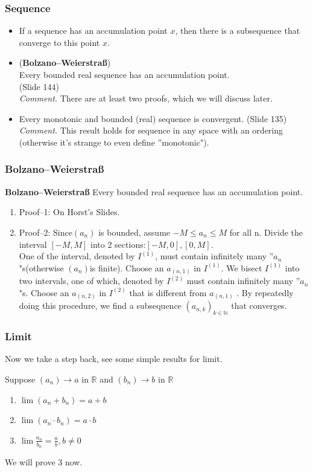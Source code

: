 \documentclass[12pt, t]{beamer}
\renewcommand{\emph}[1]{{\color{Turquoise3}\textsl{#1}}}
\begin{document}
\begin{frame}
    \frametitle{Sequence}
    \begin{itemize}
        \item If a sequence has an accumulation point $x$, then there is a subsequence that converge to this point $x$.
        \item (\textbf{Bolzano--Weierstraß})\\ Every bounded real sequence has an accumulation point. \\(Slide 144)\\
              \emph{Comment.} There are at least two proofs, which we will discuss later.
        \item Every monotonic and bounded (real) sequence is convergent. (Slide 135)\\
              \emph{Comment.} This result holds for sequence in any space with an ordering (otherwise it's
              strange to even define ''monotonic").
    \end{itemize}
\end{frame}

\begin{frame}
    \frametitle{\textbf{Bolzano--Weierstraß}}
    \textbf{Bolzano--Weierstraß} Every bounded real sequence has an accumulation point.
    \begin{enumerate}
        \item Proof--1: On Horst's Slides.
        \item Proof--2:
              Since$(a_n)$ is bounded, assume $-M\leq a_n\leq M$ for all n. Divide the interval $[-M,M]$ into 2 sections:$[-M,0],[0,M]$.\\
              One of the interval, denoted by $I^{(1)}$, must contain infinitely many ''$a_n$"s(otherwise $(a_n)$is finite). Choose an $a_{(n,1)}$
              in $I^{(1)}$. We bisect $I^{(1)}$ into two intervals, one of which, denoted by $I^{(2)}$ must contain
              infinitely many ''$a_n$ "s. Choose an $a_{(n,2)}$ in $I^{(2)}$ that is different from $a_{(n,1)}$ . By
              repeatedly doing this procedure, we find a subsequence $(a_{n,k})_{k\in\mathbb{N}}$ that converges.
    \end{enumerate}
\end{frame}

\begin{frame}
    \frametitle{Limit}
    Now we take a step back, see some simple results for limit.\\
    \begin{center}
        Suppose $(a_n)\rightarrow a$ in $\mathbb{R}$ and $(b_n)\rightarrow b$ in $\mathbb{R}$
    \end{center}
    \begin{enumerate}
        \item $\lim (a_n+b_n)=a+b$
        \item $\lim (a_n\cdot b_n) =a\cdot b$
        \item $\lim \frac{a_n}{b_n}=\frac{a}{b}, b\neq 0$
    \end{enumerate}
    We will prove 3 now.
\end{frame}
\end{document}

